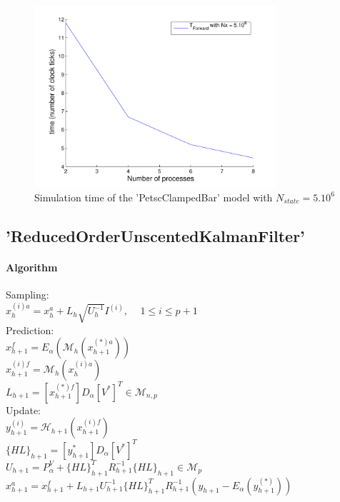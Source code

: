 \begin{figure}
  \caption{Simulation time of the 'PetscClampedBar' model with $N_{state} = 5.10^6$ }
  \label{fig:forward_time}

\includegraphics[width=0.8\textwidth]{figure/Forward_CB2.pdf}
\end{figure}



\hypertarget{seq-par-roukf}{}\subsection{'ReducedOrderUnscentedKalmanFilter'}\label{seq-par-roukf}


\hypertarget{seq-par-rouk-algof}{}\paragraph{Algorithm}\label{seq-par-roukf-algo}

Sampling:\\
  $ x_{h}^{(i)a} = x_h^a + L_h\sqrt{U_h^{-1}}I^{(i)} \textrm{, } \quad 1\leq i \leq p+1 $\\
  Prediction:\\
  $ x_{h+1}^f = E_\alpha(\mathcal{M}_{h}(x_{h+1}^{(*)a})) $\\
  $ x_{h+1}^{(i)f} = \mathcal{M}_{h}(x_{h}^{(i)a})$\\
  $ L_{h+1} = [x_{h+1}^{(*)f}]D_\alpha [V^*]^T \in \mathcal{M}_{n,p} $\\

  Update:\\
  $ y_{h+1}^{(i)} = \mathcal{H}_{h+1}(x_{h+1}^{(i)f})$\\
  $ \{HL\}_{h+1} = [y_{h+1}^{*}]D_\alpha [V^*]^T$\\
  $ U_{h+1} = P_{\alpha}^V +  \{HL\}_{h+1}^T R_{h+1}^{-1} \{HL\}_{h+1} \in \mathcal{M}_{p}$\\
  $ x_{h+1}^a = x_{h+1}^f + L_{h+1}U_{h+1}^{-1}\{HL\}_{h+1}^T R_{h+1}^{-1} (y_{h+1}-E_\alpha(y_{h+1}^{(*)}))$\\




